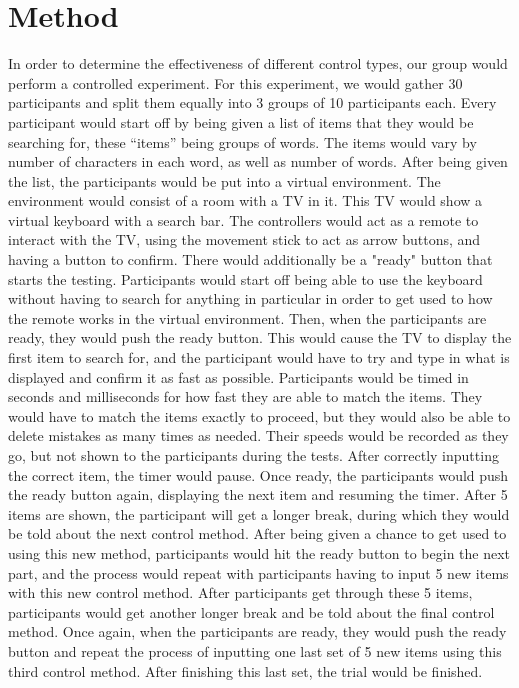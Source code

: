 \documentclass{vgtc}                          %
\begin{document}
\section{Method}

In order to determine the effectiveness of different control types, our group would perform a controlled experiment. For this experiment, we would gather 30 participants and split them equally into 3 groups of 10 participants each. Every participant would start off by being given a list of items that they would be searching for, these “items” being groups of words. The items would vary by number of characters in each word, as well as number of words. After being given the list, the participants would be put into a virtual environment. The environment would consist of a room with a TV in it. This TV would show a virtual keyboard with a search bar. The controllers would act as a remote to interact with the TV, using the movement stick to act as arrow buttons, and having a button to confirm. There would additionally be a "ready" button that starts the testing. Participants would start off being able to use the keyboard without having to search for anything in particular in order to get used to how the remote works in the virtual environment. Then, when the participants are ready, they would push the ready button. This would cause the TV to display the first item to search for, and the participant would have to try and type in what is displayed and confirm it as fast as possible. Participants would be timed in seconds and milliseconds for how fast they are able to match the items. They would have to match the items exactly to proceed, but they would also be able to delete mistakes as many times as needed. Their speeds would be recorded as they go, but not shown to the participants during the tests. After correctly inputting the correct item, the timer would pause. Once ready, the participants would push the ready button again, displaying the next item and resuming the timer. After 5 items are shown, the participant will get a longer break, during which they would be told about the next control method. After being given a chance to get used to using this new method, participants would hit the ready button to begin the next part, and the process would repeat with participants having to input 5 new items with this new control method. After participants get through these 5 items, participants would get another longer break and be told about the final control method. Once again, when the participants are ready, they would push the ready button and repeat the process of inputting one last set of 5 new items using this third control method. After finishing this last set, the trial would be finished. \\[1em]
\end{document}
